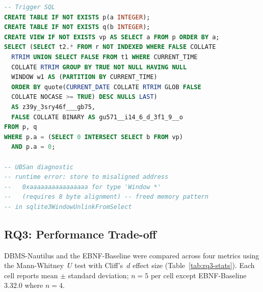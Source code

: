 \begin{lstlisting}[caption={BC004: Use-after-free in \texttt{sqlite3WindowUnlinkFromSelect}.},label={lst:bc004},language=SQL,numbers=none]
-- Trigger SQL
CREATE TABLE IF NOT EXISTS p(a INTEGER);
CREATE TABLE IF NOT EXISTS q(b INTEGER);
CREATE VIEW IF NOT EXISTS vp AS SELECT a FROM p ORDER BY a;
SELECT (SELECT t2.* FROM r NOT INDEXED WHERE FALSE COLLATE
  RTRIM UNION SELECT FALSE FROM t1 WHERE CURRENT_TIME
  COLLATE RTRIM GROUP BY TRUE NOT NULL HAVING NULL
  WINDOW w1 AS (PARTITION BY CURRENT_TIME)
  ORDER BY quote(CURRENT_DATE COLLATE RTRIM GLOB FALSE
  COLLATE NOCASE >= TRUE) DESC NULLS LAST)
  AS z39y_3sry46f___gb75,
  FALSE COLLATE BINARY AS gu571__i14_6_d_3f1_9__o
FROM p, q
WHERE p.a = (SELECT 0 INTERSECT SELECT b FROM vp)
  AND p.a = 0;

-- UBSan diagnostic
-- runtime error: store to misaligned address
--   0xaaaaaaaaaaaaaaaa for type 'Window *'
--   (requires 8 byte alignment) -- freed memory pattern
-- in sqlite3WindowUnlinkFromSelect
\end{lstlisting}

\vspace{0.5em}
\noindent{}
\vspace{0.5em}


\subsection{RQ3: Performance Trade-off}
\label{sec:rq3-results}

DBMS-Nautilus and the EBNF-Baseline were compared across four metrics using the Mann-Whitney~$U$ test with Cliff's~$d$ effect size (Table~\ref{tab:rq3-stats}). Each cell reports mean $\pm$ standard deviation; $n=5$ per cell except EBNF-Baseline 3.32.0 where $n=4$.

